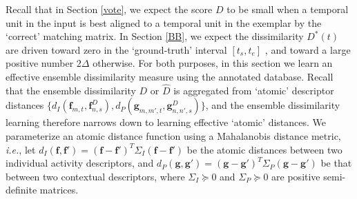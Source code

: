 \documentclass[10pt,twocolumn,letterpaper]{article}
\begin{document}
Recall that in Section \ref{vote}, we expect the score $D$ to be small when a temporal unit in the input is best aligned to a temporal unit in the exemplar by the `correct' matching matrix. In Section \ref{BB}, we expect the dissimilarity $D^{*}(t)$ are driven toward zero in the `ground-truth' interval $[t_{s}, t_{e}]$ , and toward a large positive number $2\Delta$ otherwise. For both purposes, in this section we learn an effective ensemble dissimilarity measure using the annotated database. Recall that the ensemble dissimilarity $D$ or $\hat{D}$ is aggregated from `atomic' descriptor distances $\{ d_{I}(\mathbf{f}_{m,t}, \mathbf{f}^{D}_{n,s}), d_{P}(\mathbf{g}_{m,m',t}, \mathbf{g}^{D}_{n,n',s})\}$, and the ensemble dissimilarity learning therefore narrows down to learning effective `atomic'  distances.  We parameterize an atomic distance function using a Mahalanobis distance metric, \textit{i.e.}, let $d_{I}(\mathbf{f}, \mathbf{f}')=(\mathbf{f}-\mathbf{f}')^{T}\Sigma_{I}(\mathbf{f}-\mathbf{f}')$ be the atomic distances between two individual activity descriptors, and $d_{P}(\mathbf{g}, \mathbf{g}')=(\mathbf{g}-\mathbf{g}')^{T}\Sigma_{P}(\mathbf{g}-\mathbf{g}')$ be that between two contextual descriptors, where $\Sigma_{I}\succeq 0$ and $\Sigma_{P}\succeq 0$  are positive semi-definite matrices.  
\end{document}
